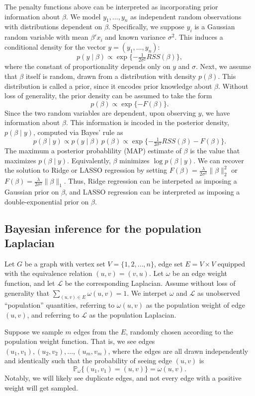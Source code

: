 \documentclass[12pt]{article}
\newcommand{\prob}{\mathbb{P}}
\theoremstyle{plain}
\begin{document}
The penalty functions above can be interpreted as incorporating prior
information about $\beta$.  We model $y_1, \dotsc, y_n$ as independent
random observations with distributions dependent on $\beta$.
Specifically, we suppose $y_i$ is a Gaussian random variable with mean
$\beta' x_i$ and known variance $\sigma^2$.  This induces a conditional
density for the vector $y = (y_1, \dotsc, y_n)$:
\[
  p(y \mid \beta)
    \propto
     \exp\{ -\tfrac{1}{2 \sigma^2} RSS(\beta) \},
\]
where the constant of proportionality depends only on $y$ and $\sigma$.
Next, we assume that $\beta$ itself is random, drawn from a
distribution with density $p(\beta)$.  This distribution is called a
prior, since it encodes prior knowledge about $\beta$.  Without loss
of generality, the prior density can be assumed to take the form
\[
  p(\beta) \propto \exp\{ -F(\beta) \}.
\]
Since the two random variables are dependent, upon observing $y$, we
have information about $\beta$.  This information is incoded in the
posterior density, $p(\beta \mid y)$, computed via
Bayes' rule as
\[
  p(\beta \mid y)
    \propto p(y \mid \beta) \, p(\beta)
    \propto \exp\{ -\tfrac{1}{2 \sigma^2} RSS(\beta) - F(\beta) \}.
\]
The maximum a posterior probablility (MAP) estimate of $\beta$ is the
value that maximizes $p(\beta \mid y)$.  Equivalently, $\beta$
minimizes $\log p(\beta \mid y)$.  We can recover the solution to
Ridge or LASSO regression by setting
$F(\beta) = \tfrac{\lambda}{2 \sigma^2} \| \beta \|_2^2$ or
$F(\beta) = \tfrac{\lambda}{2 \sigma^2} \| \beta \|_1$.  Thus, Ridge
regression can be interpeted as imposing a Gaussian prior on $\beta$,
and LASSO regression can be interpreted as imposing a
double-exponential prior on $\beta$.


\subsection{Bayesian inference for the population Laplacian}

Let $G$ be a graph with vertex set $V = \{ 1, 2, \dotsc, n \}$, edge
set $E = V \times V$ equipped with the equivalence relation
$(u,v) = (v,u)$.  Let $\omega$ be an edge weight function, and let
$\mathcal{L}$ be the corresponding Laplacian.  Assume without loss of
generality that $\sum_{(u,v) \in E} \omega(u,v) = 1$.  We interpet
$\omega$ and $\mathcal{L}$ as unobserved ``population'' quantities,
referring to $\omega(u,v)$ as the population weight of edge $(u,v)$,
and referring to $\mathcal{L}$ as the population Laplacian.

Suppose we sample $m$ edges from the $E$, randomly chosen
according to the population weight function.  That is, we see edges
$(u_1, v_1), (u_2, v_2),  \dotsc, (u_m, v_m)$, where the edges are
all drawn independently and identically such that the probability of
seeing edge $(u,v)$ is
\[
  \prob_\omega\{ (u_1, v_1) = (u,v) \} = \omega(u,v).
\]
Notably, we will likely see duplicate edges, and not every edge with a
positive weight will get sampled.
\end{document}
